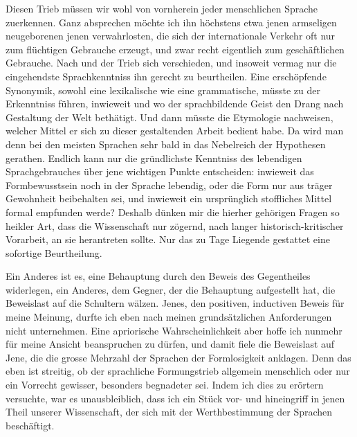 Diesen Trieb müssen wir wohl von vornherein jeder menschlichen Sprache zuerkennen. Ganz absprechen möchte ich ihn höchstens etwa jenen armseligen neugeborenen  jenen verwahrlosten, die sich der internationale Verkehr oft nur zum flüchtigen Gebrauche erzeugt, und zwar  recht eigentlich zum geschäftlichen Gebrauche. Nach  und  der Trieb sich verschieden, und insoweit vermag nur die eingehendste Sprachkenntniss ihn gerecht zu beurtheilen. Eine erschöpfende Synonymik, sowohl eine lexikalische wie eine grammatische, müsste zu der Erkenntniss führen, inwieweit und wo der sprachbildende Geist den Drang nach  Gestaltung der Welt bethätigt. Und dann müsste die Etymologie nachweisen, welcher Mittel er sich zu dieser gestaltenden Arbeit bedient habe. Da wird man denn bei den meisten Sprachen sehr bald in das Nebelreich der Hypothesen gerathen. Endlich kann nur die gründlichste Kenntniss des lebendigen Sprachgebrauches über jene wichtigen Punkte entscheiden: inwieweit das Formbewusstsein noch in der Sprache lebendig, oder die Form nur aus träger Gewohnheit beibehalten sei, und inwieweit ein ursprünglich stoffliches Mittel formal empfunden werde? Deshalb dünken mir die hierher gehörigen Fragen so heikler Art, dass die Wissenschaft nur zögernd, nach langer historisch-kritischer Vorarbeit, an sie herantreten sollte. Nur das zu Tage Liegende gestattet eine sofortige Beurtheilung.

Ein Anderes ist es, eine Behauptung durch den Beweis des Gegentheiles widerlegen, ein Anderes, dem Gegner, der die Behauptung aufgestellt hat, die Beweislast auf die Schultern wälzen. Jenes, den positiven, inductiven Beweis für meine Meinung, durfte ich eben nach \label{fp.348} meinen grundsätzlichen Anforderungen nicht unternehmen. Eine apriorische Wahrscheinlichkeit aber hoffe ich nunmehr für meine Ansicht beanspruchen zu dürfen, und damit fiele die Beweislast auf Jene, die die grosse Mehrzahl der Sprachen der Formlosigkeit anklagen. Denn das eben ist streitig, ob der sprachliche Formungstrieb allgemein menschlich \label{sp.365} oder nur ein Vorrecht gewisser, besonders begnadeter  sei. Indem ich dies zu erörtern versuchte, war es unausbleiblich, dass ich ein Stück vor- und hineingriff in jenen Theil unserer Wissenschaft, der sich mit der Werthbestimmung der Sprachen beschäftigt.

